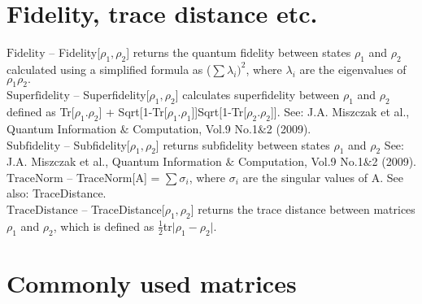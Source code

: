\documentclass[a4paper,10pt]{scrartcl}
\begin{document}
\section{Fidelity, trace distance etc.}

\noindent\textbf{$ \text{Fidelity} $ }-- Fidelity[$ \rho _1,\rho _2 $] returns the quantum fidelity between states $ \rho _1 $ and $ \rho _2 $ calculated using a simplified formula as ($\sum $$ \lambda _i)^2 $, where $ \lambda _i $ are the eigenvalues of $ \rho _1\rho _2. $\\[8pt]
\noindent\textbf{$ \text{Superfidelity} $ }-- Superfidelity[$ \rho _1,\rho _2 $] calculates superfidelity between $ \rho _1 $ and $ \rho _2 $ defined as Tr[$ \rho _1.\rho _2 $] + Sqrt[1-Tr[$ \rho _1.\rho _1 $]]Sqrt[1-Tr[$ \rho _2.\rho _2 $]]. See: J.A. Miszczak et al., Quantum Information $\&$ Computation, Vol.9 No.1$\&$2 (2009).$  $\\[8pt]
\noindent\textbf{$ \text{Subfidelity} $ }-- Subfidelity[$ \rho _1,\rho _2 $] returns subfidelity between states $ \rho _1 $ and $ \rho _2 $ See: J.A. Miszczak et al., Quantum Information $\&$ Computation, Vol.9 No.1$\&$2 (2009).$  $\\[8pt]
\noindent\textbf{$ \text{TraceNorm} $ }-- TraceNorm[A] = $\sum $$ \sigma _i $, where $ \sigma _i $ are the singular values of A. See also: TraceDistance.$  $\\[8pt]
\noindent\textbf{$ \text{TraceDistance} $ }-- TraceDistance[$ \rho _1,\rho _2 $] returns the trace distance between matrices $ \rho _1 $ and $ \rho _2 $, which is defined as $ \frac{1}{2} $tr$|$$ \rho _1-\rho _2\text{$|$.} $\\[8pt]
\section{Commonly used matrices}
\end{document}
